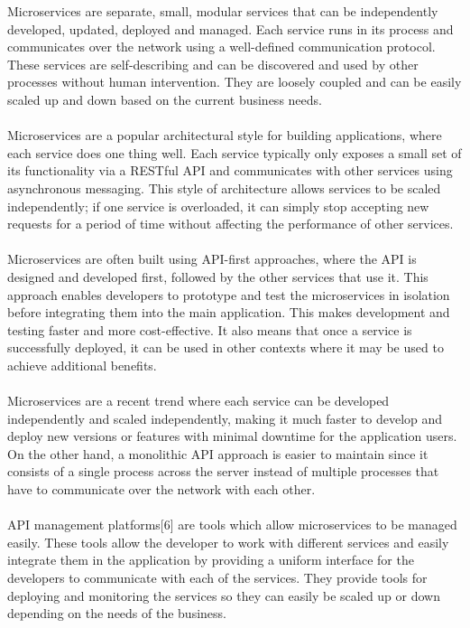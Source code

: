 \documentclass[MMR,Master,nenglish]{twbook}%
\begin{document}
\noindent
Microservices are separate, small, modular services that can be independently developed, updated, deployed and managed. Each service runs in its process and communicates over the network using a well-defined communication protocol.\cite{fow2014} These services are self-describing and can be discovered and used by other processes without human intervention. They are loosely coupled and can be easily scaled up and down based on the current business needs.
\\
\\
Microservices are a popular architectural style for building applications, where each service does one thing well. Each service typically only exposes a small set of its functionality via a RESTful API and communicates with other services using asynchronous messaging.\cite{gooMes} This style of architecture allows services to be scaled independently; if one service is overloaded, it can simply stop accepting new requests for a period of time without affecting the performance of other services.
\\
\\
Microservices are often built using API-first approaches, where the API is designed and developed first, followed by the other services that use it. This approach enables developers to prototype and test the microservices in isolation before integrating them into the main application. This makes development and testing faster and more cost-effective. It also means that once a service is successfully deployed, it can be used in other contexts where it may be used to achieve additional benefits.
\\
\\
Microservices are a recent trend where each service can be developed independently and scaled independently, making it much faster to develop and deploy new versions or features with minimal downtime for the application users. On the other hand, a monolithic API approach is easier to maintain since it consists of a single process across the server instead of multiple processes that have to communicate over the network with each other. \cite{pat2021}
\\
\\
API management platforms[6] are tools which allow microservices to be managed easily. These tools allow the developer to work with different services and easily integrate them in the application by providing a uniform interface for the developers to communicate with each of the services. They provide tools for deploying and monitoring the services so they can easily be scaled up or down depending on the needs of the business.
\end{document}
